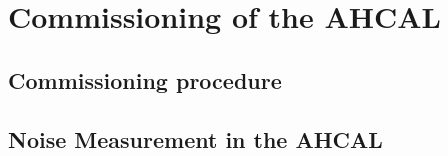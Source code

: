 \chapter{Commissioning of the AHCAL}

\section{Commissioning procedure}

\section{Noise Measurement in the AHCAL}
